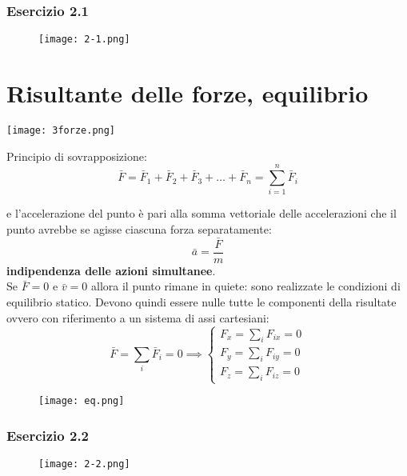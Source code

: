 \documentclass[../../main.tex]{subfiles}
\begin{document}
\subsubsection{Esercizio 2.1}
\begin{figure}[H]
    \centering
    \texttt{[image: 2-1.png]}
\end{figure}

\section{Risultante delle forze, equilibrio}
\begin{minipage}
    {0.5\textwidth}
    \centering
    \texttt{[image: 3forze.png]}
\end{minipage}
\begin{minipage}{0.5\textwidth}
    \centering
    Principio di sovrapposizione:\\
    \[
        \bar F = \bar F_1 + \bar F_2 + \bar F_3 + \ldots + \bar F_n = \sum_{i=1}^{n} \bar F_i
    \]
\end{minipage}
e l'accelerazione del punto è pari alla somma vettoriale delle accelerazioni che il punto avrebbe se agisse ciascuna forza separatamente:
\[
    \bar a = \dfrac{\bar F}{m}
\]
\textbf{indipendenza delle azioni simultanee}.\\
Se $\bar F = 0$ e $\bar v = 0$ allora il punto rimane in quiete: sono realizzate le condizioni di equilibrio statico. Devono quindi essere nulle tutte le componenti della risultate ovvero con riferimento a un sistema di assi cartesiani:
\[
    \bar F = \sum_{i} \bar F_i = 0 \implies \begin{cases}
        F_x = \sum_i F_{ix} = 0 \\
        F_y = \sum_i F_{iy} = 0 \\
        F_z = \sum_i F_{iz} = 0
    \end{cases}
\]
\begin{figure}[H]
    \centering
    \texttt{[image: eq.png]}
\end{figure}
\subsubsection{Esercizio 2.2}
\begin{figure}[H]
    \centering
    \texttt{[image: 2-2.png]}
\end{figure}
\end{document}
